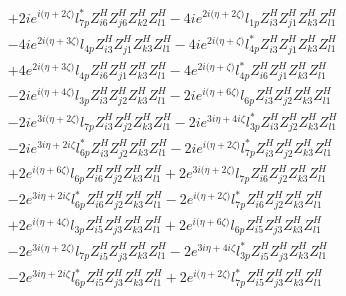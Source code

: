 \begin{align}
 &+2 i e^{i \Big(\eta +2 \zeta \Big)} l_{7p}^* Z_{{i 6}}^{H} Z_{{j 6}}^{H} Z_{{k 2}}^{H} Z_{{l 1}}^{H} -4 i e^{2 i \Big(\eta +2 \zeta \Big)} l_{1p} Z_{{i 3}}^{H} Z_{{j 1}}^{H} Z_{{k 3}}^{H} Z_{{l 1}}^{H} \nonumber \\ 
 &-4 i e^{2 i \Big(\eta +3 \zeta \Big)} l_{4p} Z_{{i 3}}^{H} Z_{{j 1}}^{H} Z_{{k 3}}^{H} Z_{{l 1}}^{H} -4 i e^{2 i \Big(\eta +\zeta \Big)} l_{4p}^* Z_{{i 3}}^{H} Z_{{j 1}}^{H} Z_{{k 3}}^{H} Z_{{l 1}}^{H} \nonumber \\ 
 &+4 e^{2 i \Big(\eta +3 \zeta \Big)} l_{4p} Z_{{i 6}}^{H} Z_{{j 1}}^{H} Z_{{k 3}}^{H} Z_{{l 1}}^{H} -4 e^{2 i \Big(\eta +\zeta \Big)} l_{4p}^* Z_{{i 6}}^{H} Z_{{j 1}}^{H} Z_{{k 3}}^{H} Z_{{l 1}}^{H} \nonumber \\ 
 &-2 i e^{i \Big(\eta +4 \zeta \Big)} l_{3p} Z_{{i 3}}^{H} Z_{{j 2}}^{H} Z_{{k 3}}^{H} Z_{{l 1}}^{H} -2 i e^{i \Big(\eta +6 \zeta \Big)} l_{6p} Z_{{i 3}}^{H} Z_{{j 2}}^{H} Z_{{k 3}}^{H} Z_{{l 1}}^{H} \nonumber \\ 
 &-2 i e^{3 i \Big(\eta +2 \zeta \Big)} l_{7p} Z_{{i 3}}^{H} Z_{{j 2}}^{H} Z_{{k 3}}^{H} Z_{{l 1}}^{H} -2 i e^{3 i \eta +4 i \zeta } l_{3p}^* Z_{{i 3}}^{H} Z_{{j 2}}^{H} Z_{{k 3}}^{H} Z_{{l 1}}^{H} \nonumber \\ 
 &-2 i e^{3 i \eta +2 i \zeta } l_{6p}^* Z_{{i 3}}^{H} Z_{{j 2}}^{H} Z_{{k 3}}^{H} Z_{{l 1}}^{H} -2 i e^{i \Big(\eta +2 \zeta \Big)} l_{7p}^* Z_{{i 3}}^{H} Z_{{j 2}}^{H} Z_{{k 3}}^{H} Z_{{l 1}}^{H} \nonumber \\ 
 &+2 e^{i \Big(\eta +6 \zeta \Big)} l_{6p} Z_{{i 6}}^{H} Z_{{j 2}}^{H} Z_{{k 3}}^{H} Z_{{l 1}}^{H} +2 e^{3 i \Big(\eta +2 \zeta \Big)} l_{7p} Z_{{i 6}}^{H} Z_{{j 2}}^{H} Z_{{k 3}}^{H} Z_{{l 1}}^{H} \nonumber \\ 
 &-2 e^{3 i \eta +2 i \zeta } l_{6p}^* Z_{{i 6}}^{H} Z_{{j 2}}^{H} Z_{{k 3}}^{H} Z_{{l 1}}^{H} -2 e^{i \Big(\eta +2 \zeta \Big)} l_{7p}^* Z_{{i 6}}^{H} Z_{{j 2}}^{H} Z_{{k 3}}^{H} Z_{{l 1}}^{H} \nonumber \\ 
 &+2 e^{i \Big(\eta +4 \zeta \Big)} l_{3p} Z_{{i 5}}^{H} Z_{{j 3}}^{H} Z_{{k 3}}^{H} Z_{{l 1}}^{H} +2 e^{i \Big(\eta +6 \zeta \Big)} l_{6p} Z_{{i 5}}^{H} Z_{{j 3}}^{H} Z_{{k 3}}^{H} Z_{{l 1}}^{H} \nonumber \\ 
 &-2 e^{3 i \Big(\eta +2 \zeta \Big)} l_{7p} Z_{{i 5}}^{H} Z_{{j 3}}^{H} Z_{{k 3}}^{H} Z_{{l 1}}^{H} -2 e^{3 i \eta +4 i \zeta } l_{3p}^* Z_{{i 5}}^{H} Z_{{j 3}}^{H} Z_{{k 3}}^{H} Z_{{l 1}}^{H} \nonumber \\ 
 &-2 e^{3 i \eta +2 i \zeta } l_{6p}^* Z_{{i 5}}^{H} Z_{{j 3}}^{H} Z_{{k 3}}^{H} Z_{{l 1}}^{H} +2 e^{i \Big(\eta +2 \zeta \Big)} l_{7p}^* Z_{{i 5}}^{H} Z_{{j 3}}^{H} Z_{{k 3}}^{H} Z_{{l 1}}^{H} \nonumber \\ 

\end{align}
